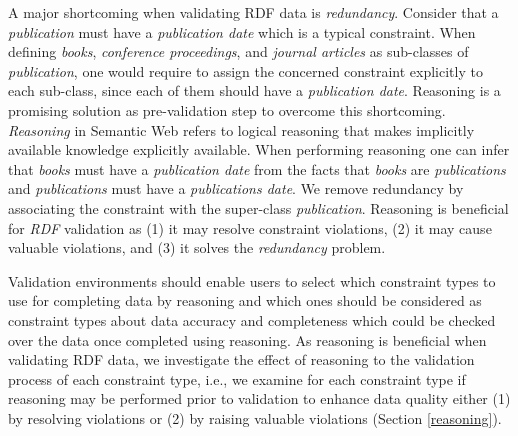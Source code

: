 \documentclass{acm_proc_article-sp}
\begin{document}

A major shortcoming when validating RDF data is \emph{redundancy}.
Consider that a \emph{publication} must have a \emph{publication date} which is a typical constraint.
When defining \emph{books}, \emph{conference proceedings}, and \emph{journal articles} as sub-classes of \emph{publication}, 
one would require to assign the concerned constraint explicitly to each sub-class, 
since each of them should have a \emph{publication date}.
Reasoning is a promising solution as pre-validation step to overcome this shortcoming. 
\emph{Reasoning} in Semantic Web refers to logical reasoning that  makes implicitly available knowledge explicitly available.
When performing reasoning one can infer that \emph{books} must have a \emph{publication date} 
from the facts that \emph{books} are \emph{publications} and \emph{publications} must have a \emph{publications date}.  
We remove redundancy by associating the constraint with the super-class \emph{publication}.
Reasoning is beneficial for \emph{RDF} validation as 
(1) it may resolve constraint violations, 
(2) it may cause valuable violations, and 
(3) it solves the \emph{redundancy} problem. 

Validation environments should enable users to select which constraint types to use for completing data by reasoning 
and which ones should be considered as constraint types about data accuracy and completeness which could be checked over the data once completed using reasoning.
As reasoning is beneficial when validating RDF data, 
we investigate the effect of reasoning to the validation process of each constraint type, i.e.,
we examine for each constraint type if reasoning may be performed prior to validation to enhance data quality
either (1) by resolving violations or (2) by raising valuable violations (Section \ref{reasoning}).
\end{document}
